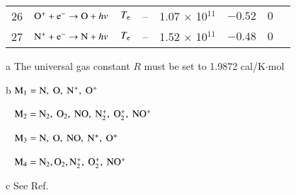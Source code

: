 \documentclass{warpdoc}
\begin{document}
\begin{table}[t]
\begin{center}
\begin{threeparttable}
\begin{tabular}{cccccccc}
26 & $\rm O^+ + e^- \rightarrow O + {\it hv} $ & $T_{\rm e}$ & -- & 1.07 $\times$ 10$^{11}$  & $-0.52$ & $0$ & \cite{jtht:1993:park}\\
27 & $\rm N^+ + e^- \rightarrow N + {\it hv} $ & $T_{\rm e}$ & -- & 1.52 $\times$ 10$^{11}$  & $-0.48$ & $0$ & \cite{jtht:1993:park}\\
\bottomrule
\end{tabular}
\begin{tablenotes}
\item[{a}] The universal gas constant $R$ must be set to 1.9872	cal/K$\cdot$mol 
\item[{b}] $\rm M_1=N,~O,~N^+,~O^+$
\item[~] $\rm M_2=N_2,~O_2,~NO,~N_2^+,~O_2^+,~NO^+$
\item[~] $\rm M_3= N,~O,~NO,~N^+,~O^+$
\item[~] $\rm M_4=N_2,O_2,N_2^+,~O_2^+,~NO^+$
\item[{c}] See Ref.\ \cite{jtht:1991:candler}
\end{tablenotes}
\label{tab:park}
\end{threeparttable}
\end{center}
\end{table}
%
\end{document}

